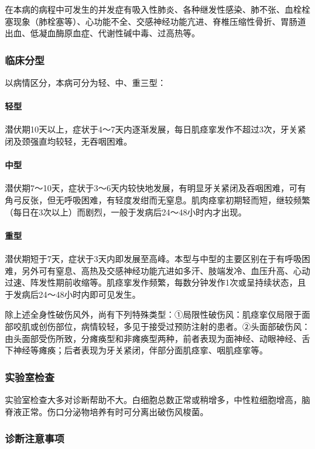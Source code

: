 在本病的病程中可发生的并发症有吸入性肺炎、各种继发性感染、肺不张、血栓栓塞现象（肺栓塞等）、心功能不全、交感神经功能亢进、脊椎压缩性骨折、胃肠道出血、低凝血酶原血症、代谢性碱中毒、过高热等。

\subsubsection{临床分型}

以病情区分，本病可分为轻、中、重三型：

\paragraph{轻型}

潜伏期10天以上，症状于4～7天内逐渐发展，每日肌痉挛发作不超过3次，牙关紧闭及颈强直均较轻，无吞咽困难。

\paragraph{中型}

潜伏期7～10天，症状于3～6天内较快地发展，有明显牙关紧闭及吞咽困难，可有角弓反张，但无呼吸困难，有轻度发绀而无窒息。肌肉痉挛初期轻而短，继较频繁（每日在3次以上）而剧烈，一般于发病后24～48小时内才出现。

\paragraph{重型}

潜伏期短于7天，症状于3天内即发展至高峰。本型与中型的主要区别在于有呼吸困难，另外可有窒息、高热及交感神经功能亢进如多汗、肢端发冷、血压升高、心动过速、阵发性期前收缩等。肌痉挛发作频繁，每数分钟发作1次或呈持续状态，且于发病后24～48小时内即可见发生。

除上述全身性破伤风外，尚有下列特殊类型：①局限性破伤风：肌痉挛仅局限于面部咬肌或创伤部位，病情较轻，多见于接受过预防注射的患者。②头面部破伤风：由头面部受伤所致，分瘫痪型和非瘫痪型两种，前者表现为面神经、动眼神经、舌下神经等瘫痪；后者表现为牙关紧闭，伴部分面肌痉挛、咽肌痉挛等。

\subsubsection{实验室检查}

实验室检查大多对诊断帮助不大。白细胞总数正常或稍增多，中性粒细胞增高，脑脊液正常。伤口分泌物培养有时可分离出破伤风梭菌。

\subsubsection{诊断注意事项}

